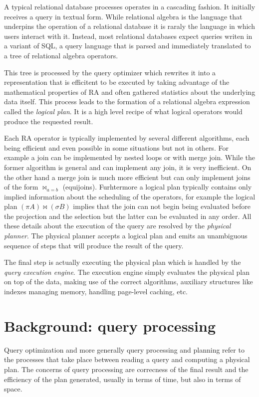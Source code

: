 A typical relational database processes operates in a cascading
fashion. It initially receives a query in textual form. While
relational algebra is the language that underpins the operation of a
relational database it is raraly the language in which users interact
with it. Instead, most relational databases expect queries writen in a
variant of SQL, a query language that is parsed and immediately
translated to a tree of relational algebra operators.

This tree is processed by the query optimizer which rewrites it into a
representation that is efficitent to be executed by taking advantage
of the mathematical properties of RA and often gathered statistics
about the underlying data itself. This process leads to the formation
of a relational algebra expression called the \emph{logical plan}. It is a
high level recipe of what logical operators would produce the
requested result.


Each RA operator is typically implemented by several different
algorithms, each being efficient and even possible in some situations
but not in others. For example a join can be implemented by nested
loops or with merge join.  While the former algorithm is general and
can implement any join, it is very inefficient. On the other hand a
merge join is much more efficient but can only implement joins of the
form \(\Join_{a=b}\) (equijoins). Furhtermore a logical plan typically
contains only implied information about the scheduling of the
operators, for example the logical plan \((\pi A) \Join (\sigma B)\)
implies that the join can not begin being evaluated before the
projection and the selection but the latter can be evaluated in any
order. All these details about the execution of the query are resolved
by the \emph{physical planner}. The physical planner accepts a logical
plan and emits an unambiguous sequence of steps that will produce the
result of the query.

The final step is actually executing the physical plan which is
handled by the \emph{query execution engine}. The execution engine simply
evaluates the physical plan on top of the data, making use of the
correct algorithms, auxiliary structures like indexes managing memory,
handling page-level caching, etc.

\section{Background: query processing}
\label{sec:org1ddf14b}
Query optimization and more generally query processing and planning
refer to the processes that take place between reading a query and
computing a physical plan. The concerns of query processing are
correcness of the final result and the efficiency of the plan
generated, usually in terms of time, but also in terms of space.

